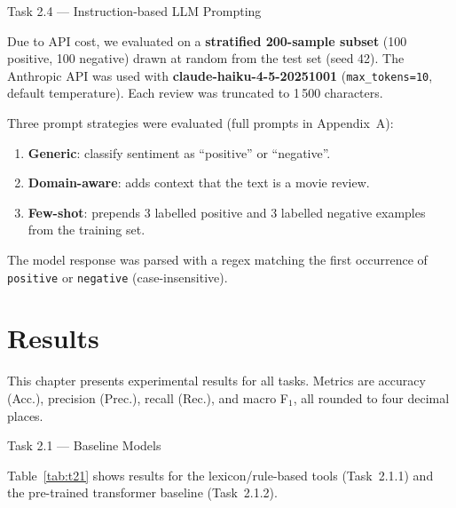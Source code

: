 \documentclass[12pt,reqno,twoside]{amsbook}
\makeatletter
\def\section{\@startsection{section}{1}%
      \z@{.5\linespacing\@plus.7\linespacing}{.25\linespacing}%
      {\normalfont\bfseries\flushleft}}
\theoremstyle{plain}
\numberwithin{equation}{chapter}
\numberwithin{section}{chapter}
\makeatother
\begin{document}
\section{Task 2.4 --- Instruction-based LLM Prompting}

\noindent Due to API cost, we evaluated on a \textbf{stratified 200-sample subset}
(100 positive, 100 negative) drawn at random from the test set (seed 42).
The Anthropic API was used with \textbf{claude-haiku-4-5-20251001}
(\texttt{max\_tokens=10}, default temperature).
Each review was truncated to 1\,500 characters.

Three prompt strategies were evaluated (full prompts in Appendix~A):

\begin{enumerate}[noitemsep]
  \item \textbf{Generic}: classify sentiment as ``positive'' or ``negative''.
  \item \textbf{Domain-aware}: adds context that the text is a movie review.
  \item \textbf{Few-shot}: prepends 3 labelled positive and 3 labelled negative
        examples from the training set.
\end{enumerate}

\noindent The model response was parsed with a regex matching the first occurrence
of \texttt{positive} or \texttt{negative} (case-insensitive).

\chapter{Results}\label{ch:results}

\noindent This chapter presents experimental results for all tasks.
Metrics are accuracy (Acc.), precision (Prec.), recall (Rec.), and macro
F$_1$, all rounded to four decimal places.

\section{Task 2.1 --- Baseline Models}

\noindent Table~\ref{tab:t21} shows results for the lexicon/rule-based tools
(Task~2.1.1) and the pre-trained transformer baseline (Task~2.1.2).
\end{document}
